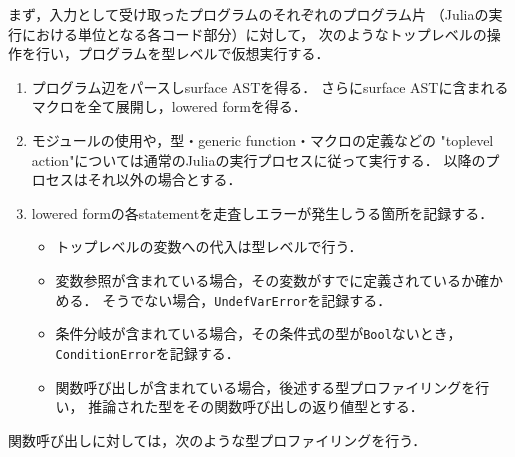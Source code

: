 まず，入力として受け取ったプログラムのそれぞれのプログラム片
（Juliaの実行における単位となる各コード部分）に対して，
次のようなトップレベルの操作を行い，プログラムを型レベルで仮想実行する．

\begin{enumerate}
  \item プログラム辺をパースしsurface ASTを得る．
        さらにsurface ASTに含まれるマクロを全て展開し，lowered formを得る．
  \item モジュールの使用や，型・generic function・マクロの定義などの
        "toplevel action"については通常のJuliaの実行プロセスに従って実行する．
        以降のプロセスはそれ以外の場合とする．
  \item lowered formの各statementを走査しエラーが発生しうる箇所を記録する．
  \begin{itemize}
    \item トップレベルの変数への代入は型レベルで行う．
    \item 変数参照が含まれている場合，その変数がすでに定義されているか確かめる．
          そうでない場合，\verb|UndefVarError|を記録する．
    \item 条件分岐が含まれている場合，その条件式の型が\verb|Bool|ないとき，
          \verb|ConditionError|を記録する．
    \item 関数呼び出しが含まれている場合，後述する型プロファイリングを行い，
          推論された型をその関数呼び出しの返り値型とする．
  \end{itemize}
\end{enumerate}

関数呼び出しに対しては，次のような型プロファイリングを行う．

